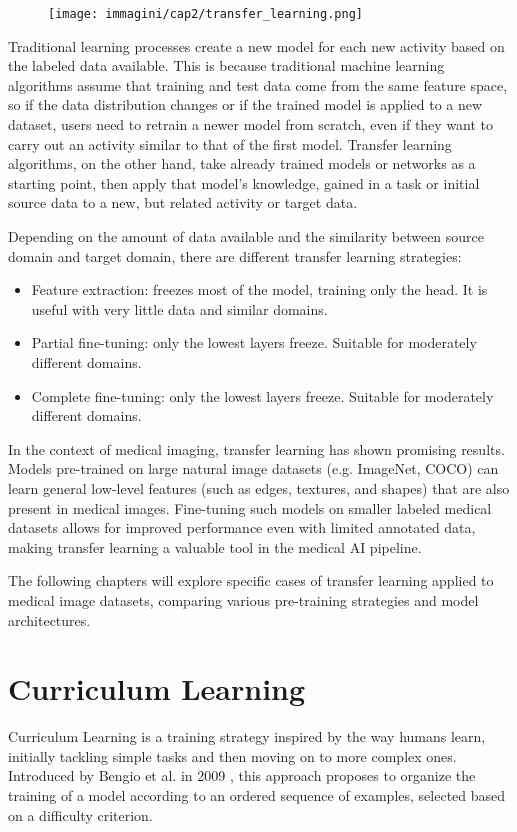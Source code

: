 \begin{figure}[!ht]
    \centering
    \texttt{[image: immagini/cap2/transfer\_learning.png]}
    \caption{}
    \label{fig:transfer_learning}
\end{figure}
Traditional learning processes create a new model for each new activity based on the labeled data available. This is because traditional machine learning algorithms assume that training and test data come from the same feature space, so if the data distribution changes or if the trained model is applied to a new dataset, users need to retrain a newer model from scratch, even if they want to carry out an activity similar to that of the first model. Transfer learning algorithms, on the other hand, take already trained models or networks as a starting point, then apply that model's knowledge, gained in a task or initial source data to a new, but related activity or target data.

Depending on the amount of data available and the similarity between source domain and target domain, there are different transfer learning strategies:

\begin{itemize}
    \item{Feature extraction}: freezes most of the model, training only the head. It is useful with very little data and similar domains.
    \item{Partial fine-tuning}: only the lowest layers freeze. Suitable for moderately different domains.
    \item {Complete fine-tuning}: only the lowest layers freeze. Suitable for moderately different domains.
\end{itemize}
In the context of medical imaging, transfer learning has shown promising results. Models pre-trained on large natural image datasets (e.g. ImageNet, COCO) can learn general low-level features (such as edges, textures, and shapes) that are also present in medical images. Fine-tuning such models on smaller labeled medical datasets allows for improved performance even with limited annotated data, making transfer learning a valuable tool in the medical AI pipeline.

The following chapters will explore specific cases of transfer learning applied to medical image datasets, comparing various pre-training strategies and model architectures.

\section{Curriculum Learning}
Curriculum Learning is a training strategy inspired by the way humans learn, initially tackling simple tasks and then moving on to more complex ones. Introduced by Bengio et al. in 2009 \cite{inproceedings}, this approach proposes to organize the training of a model according to an ordered sequence of examples, selected based on a difficulty criterion.

